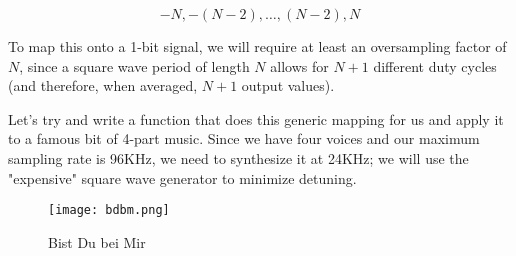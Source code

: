 \documentclass[11pt]{article}
\makeatletter
\def\maxwidth{\ifdim\Gin@nat@width>\linewidth\linewidth
    \else\Gin@nat@width\fi}
\let\Oldincludegraphics\includegraphics
\renewcommand{\includegraphics}[1]{\Oldincludegraphics[width=.8\maxwidth]{#1}}
\makeatother
\begin{document}
\[
    -N, -(N-2), \ldots, (N-2), N
\]

To map this onto a 1-bit signal, we will require at least an
oversampling factor of \(N\), since a square wave period of length \(N\)
allows for \(N+1\) different duty cycles (and therefore, when averaged,
\(N+1\) output values).

Let's try and write a function that does this generic mapping for us and
apply it to a famous bit of 4-part music. Since we have four voices and
our maximum sampling rate is 96KHz, we need to synthesize it at 24KHz;
we will use the "expensive" square wave generator to minimize detuning.

\begin{figure}
\centering
\texttt{[image: bdbm.png]}
\caption{Bist Du bei Mir}
\end{figure}
\end{document}
